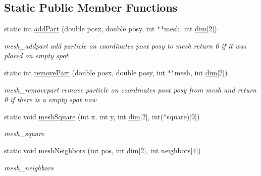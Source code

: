 \subsection*{Static Public Member Functions}
\begin{DoxyCompactItemize}
\item 
static int \hyperlink{class_mesh_a3779de5e24f96ab307153f3ab3cb67b0}{add\+Part} (double posx, double posy, int $\ast$$\ast$mesh, int \hyperlink{class_mesh_a634550923b75db84904c094677bd415e}{dim}\mbox{[}2\mbox{]})
\begin{DoxyCompactList}\small\item\em mesh\+\_\+addpart add particle on coordinates posx posy to mesh return 0 if it was placed on empty spot \end{DoxyCompactList}\item 
static int \hyperlink{class_mesh_afff05228d5e595d978f39ace32a8aea6}{remove\+Part} (double posx, double posy, int $\ast$$\ast$mesh, int \hyperlink{class_mesh_a634550923b75db84904c094677bd415e}{dim}\mbox{[}2\mbox{]})
\begin{DoxyCompactList}\small\item\em mesh\+\_\+removepart remove particle on coordinates posx posy from mesh and return 0 if there is a empty spot now \end{DoxyCompactList}\item 
static void \hyperlink{class_mesh_a824270e8af4d5eb1b93a55cc5541fb38}{mesh\+Square} (int x, int y, int \hyperlink{class_mesh_a634550923b75db84904c094677bd415e}{dim}\mbox{[}2\mbox{]}, int($\ast$square)\mbox{[}9\mbox{]})
\begin{DoxyCompactList}\small\item\em mesh\+\_\+square \end{DoxyCompactList}\item 
static void \hyperlink{class_mesh_aec76a31895c9092b5f0528a73f100d1c}{mesh\+Neighbors} (int pos, int \hyperlink{class_mesh_a634550923b75db84904c094677bd415e}{dim}\mbox{[}2\mbox{]}, int neighbors\mbox{[}4\mbox{]})
\begin{DoxyCompactList}\small\item\em mesh\+\_\+neighbors \end{DoxyCompactList}\end{DoxyCompactItemize}
